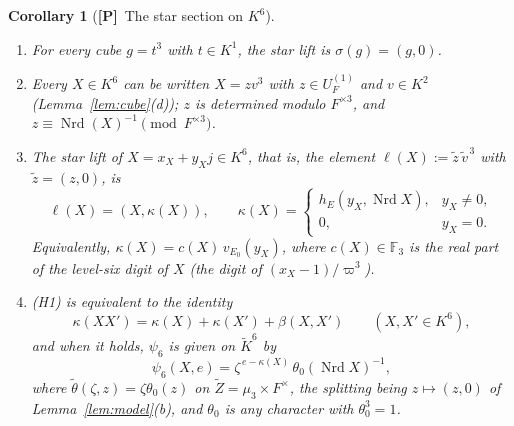 \documentclass[11pt]{article}
\newcommand{\Fq}{\mathbb F}
\newcommand{\Nrd}{\operatorname{Nrd}}
\newcommand{\tZ}{\widetilde Z}
\newcommand{\tth}{\widetilde\theta}
\newcommand{\Ptag}{\textnormal{\textbf{[P]}}}
\theoremstyle{plain}
\newtheorem{corollary}[theorem]{Corollary}
\theoremstyle{definition}
\begin{document}
\begin{corollary}[\Ptag\ The star section on $K^6$]\label{cor:starK6}
\begin{enumerate}[label=(\alph*)]
\item For every cube $g=t^3$ with $t\in K^1$, the star lift is
$\sigma(g)=(g,0)$.
\item Every $X\in K^6$ can be written $X=zv^3$ with $z\in U_F^{(1)}$ and
$v\in K^2$ (Lemma~\ref{lem:cube}(d)); $z$ is determined modulo $F^{\times3}$,
and $z\equiv\Nrd(X)^{-1}\pmod{F^{\times3}}$.
\item The star lift of $X=x_X+y_Xj\in K^6$, that is, the element
$\ell(X):=\tilde z\,\tilde v^{\,3}$ with $\tilde z=(z,0)$, is
\begin{equation}\label{eq:ell}
 \ell(X)=(X,\kappa(X)),\qquad
 \kappa(X)=\begin{cases}h_E(y_X,\Nrd X),& y_X\ne0,\\ 0,& y_X=0.\end{cases}
\end{equation}
Equivalently, $\kappa(X)=c(X)\,v_{E_0}(y_X)$, where $c(X)\in\Fq_3$ is the
real part of the level-six digit of $X$ (the digit of $(x_X-1)/\varpi^3$).
\item (H1) is equivalent to the identity
\begin{equation}\label{eq:H1identity}
 \kappa(XX')=\kappa(X)+\kappa(X')+\beta(X,X')\qquad(X,X'\in K^6),
\end{equation}
and when it holds, $\psi_6$ is given on $\tilde K^6$ by
\begin{equation}\label{eq:psi6formula}
 \psi_6(X,e)=\zeta^{\,e-\kappa(X)}\,\theta_0(\Nrd X)^{-1},
\end{equation}
where $\tth(\zeta,z)=\zeta\theta_0(z)$ on $\tZ=\mu_3\times F^\times$,
the splitting being $z\mapsto(z,0)$ of Lemma~\ref{lem:model}(b), and
$\theta_0$ is any character with $\theta_0^3=1$.
\end{enumerate}
\end{corollary}
\end{document}
